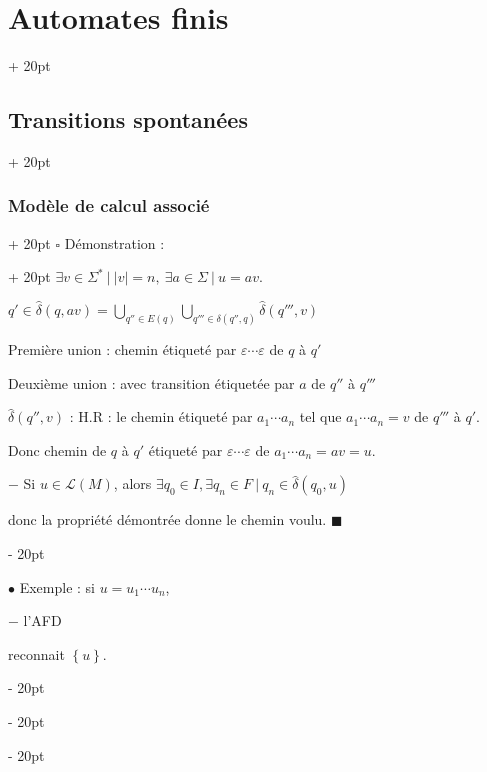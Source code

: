 \documentclass[a4paper, 12pt, twoside]{article}
\newcommand{\set}[1]{\left\{ #1 \right\}}
\newcommand{\abs}[1]{\left\lvert #1 \right\rvert}
\newcommand{\ind}[1][20pt]{\advance\leftskip + #1}
\newcommand{\deind}[1][20pt]{\advance\leftskip - #1}
\newenvironment{indt}[2][20pt]{#2 \par \ind[#1]}{\par \deind} %
\newenvironment{proof}[1][{Démonstration :}]{\begin{indt}{$\square$ #1}}{$\blacksquare$ \end{indt}}
\begin{document}
\begin{indt}{\section{Automates finis}}
\begin{indt}{\subsection{Transitions spontanées}}
\begin{indt}{\subsubsection{Modèle de calcul associé}}
\begin{proof}
                    $\exists v \in \Sigma^*\ |\ \abs v = n,\ \exists a \in \Sigma\ |\ u = av$.

                    $q' \in \hat \delta(q, av) = \displaystyle \bigcup_{q'' \in E(q)} \bigcup_{q''' \in \delta(q'', q)} \hat \delta(q''', v)$

                    Première union : chemin étiqueté par $\varepsilon \cdots \varepsilon$ de $q$ à $q'$

                    Deuxième union : avec transition étiquetée par $a$ de $q''$ à $q'''$

                    $\hat \delta(q'', v)$ : H.R : le chemin étiqueté par $a_1 \cdots a_n$ tel que $a_1 \cdots a_n = v$ de $q'''$ à $q'$.

                    Donc chemin de $q$ à $q'$ étiqueté par $\varepsilon \cdots \varepsilon$ de $a_1 \cdots a_n = av = u$.

                    \vspace{6pt}
                    
                    $-$ Si $u \in \mathcal L(M)$, alors $\exists q_0 \in I, \exists q_n \in F\ |\ q_n \in \hat \delta(q_0, u)$

                    donc la propriété démontrée donne le chemin voulu.
                \end{proof}

                \vspace{12pt}
                
                $\bullet$ Exemple : si $u = u_1 \cdots u_n$,

                $-$ l'AFD

                \begin{center}
                \end{center}

                reconnait $\set u$.


\end{indt}
\end{indt}
\end{indt}
\end{document}
